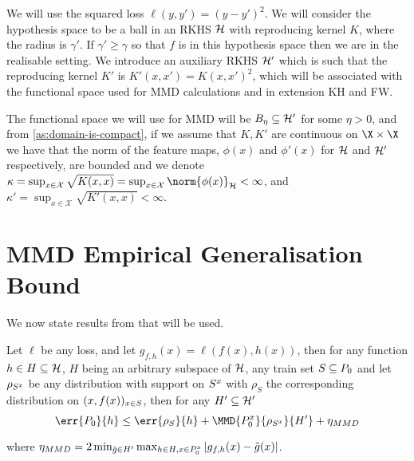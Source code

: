 We will use the squared loss \(\ell(y, y') = (y - y')^{2}\). We will consider
the hypothesis space to be a ball in an RKHS \(\mathcal{H}\) with reproducing
kernel \(K\), where the radius is \(\gamma'\). If \(\gamma' \geq \gamma\) so that \(f\) is in this
hypothesis space then we are in the realisable setting. We introduce an auxiliary RKHS \(\mathcal{H}'\) which is such
that the reproducing kernel \(K'\) is \(K'(x, x') = K(x, x')^{2}\), which will
be associated with the functional space used for MMD calculations and in
extension KH and FW.

The functional space we will use for MMD will be \(B_{\eta} \subseteq
\mathcal{H}'\) for some \(\eta > 0\), and from \ref{as:domain-is-compact}, if we
assume that \(K, K'\) are continuous on \(\X \times \X\) we have that the norm
of the feature maps, \(\phi(x)\) and \(\phi'(x)\) for \(\mathcal{H}\) and
\(\mathcal{H}'\) respectively, are bounded and we denote \(\kappa = \sup_{x \in
\mathcal{X}}\sqrt{K(x, x)} = \sup_{x \in \mathcal{X}}\norm{\phi(x)}_{\rkhs{H}} <
\infty\), and \(\kappa' = \sup_{x \in \mathcal{X}}\sqrt{K'(x, x)} < \infty\).

\section{MMD Empirical Generalisation Bound}
We now state results from \citep{viering17_nuclear_discr_activ_learn} that will be
used.
\begin{theorem}
  \label{th:mmd-emp-bound}
  Let \(\ell\) be any loss, and let \(g_{f, h}(x) = \ell(f(x), h(x))\), then for
  any function \(h \in H \subseteq \mathcal{H}\), \(H\) being an arbitrary subspace of \(\mathcal{H}\), any train set
  \(S \subseteq P_{0}\) and let \(\rho_{S^x}\) be any distribution with
  support on \(S^x\) with \(\rho_{S}\) the corresponding distribution on
  \((x, f(x))_{x \in S}\), then for any \(H' \subseteq \mathcal{H}'\)
  \begin{equation*}
    \label{eq:MMD-gen-bound}
    \err{\poolset_{0}}{h} \leq \err{\rho_{\trainset}}{h} + \MMD{\poolsetx_{0}}{\rho_{\trainsetx}}{H'} + \eta_{MMD}
  \end{equation*}
\end{theorem}
where \(\eta_{MMD} = 2 \min_{\tilde{g} \in H'} \max_{h \in H, x \in P^x_{0}} |g_{f, h}(x) - \tilde{g}(x)|\).


